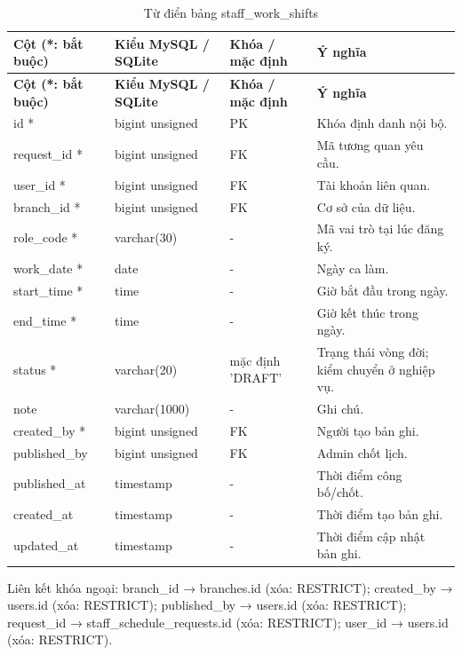 {\fontsize{10}{12}\selectfont\setlength{\tabcolsep}{3pt}\renewcommand{\arraystretch}{1.12}
\begin{longtable}{@{}L{\textwidth-4.86pt\relax} L{\textwidth-3.96pt\relax} L{\textwidth-2.88pt\relax} L{\textwidth-6.3pt\relax}@{}}
\caption{Từ điển bảng staff\_\allowbreak{}work\_\allowbreak{}shifts}\\
\toprule
\textbf{Cột (*:\allowbreak{} bắt buộc)} & \textbf{Kiểu My\allowbreak{}SQL /\allowbreak{} SQLite} & \textbf{Khóa /\allowbreak{} mặc định} & \textbf{Ý nghĩa}\\\midrule
\endfirsthead
\toprule
\textbf{Cột (*:\allowbreak{} bắt buộc)} & \textbf{Kiểu My\allowbreak{}SQL /\allowbreak{} SQLite} & \textbf{Khóa /\allowbreak{} mặc định} & \textbf{Ý nghĩa}\\\midrule
\endhead
\bottomrule\endlastfoot
id * & bigint unsigned & PK & Khóa định danh nội bộ.\allowbreak{}\\[1pt]
request\_\allowbreak{}id * & bigint unsigned & FK & Mã tương quan yêu cầu.\allowbreak{}\\[1pt]
user\_\allowbreak{}id * & bigint unsigned & FK & Tài khoản liên quan.\allowbreak{}\\[1pt]
branch\_\allowbreak{}id * & bigint unsigned & FK & Cơ sở của dữ liệu.\allowbreak{}\\[1pt]
role\_\allowbreak{}code * & varchar(30) & - & Mã vai trò tại lúc đăng ký.\allowbreak{}\\[1pt]
work\_\allowbreak{}date * & date & - & Ngày ca làm.\allowbreak{}\\[1pt]
start\_\allowbreak{}time * & time & - & Giờ bắt đầu trong ngày.\allowbreak{}\\[1pt]
end\_\allowbreak{}time * & time & - & Giờ kết thúc trong ngày.\allowbreak{}\\[1pt]
status * & varchar(20) & mặc định 'DRAFT' & Trạng thái vòng đời; kiểm chuyển ở nghiệp vụ.\allowbreak{}\\[1pt]
note & varchar(1000) & - & Ghi chú.\allowbreak{}\\[1pt]
created\_\allowbreak{}by * & bigint unsigned & FK & Người tạo bản ghi.\allowbreak{}\\[1pt]
published\_\allowbreak{}by & bigint unsigned & FK & Admin chốt lịch.\allowbreak{}\\[1pt]
published\_\allowbreak{}at & timestamp & - & Thời điểm công bố/\allowbreak{}chốt.\allowbreak{}\\[1pt]
created\_\allowbreak{}at & timestamp & - & Thời điểm tạo bản ghi.\allowbreak{}\\[1pt]
updated\_\allowbreak{}at & timestamp & - & Thời điểm cập nhật bản ghi.\allowbreak{}\\[1pt]
\end{longtable}}
Liên kết khóa ngoại:\allowbreak{} branch\_\allowbreak{}id → branches.\allowbreak{}id (xóa:\allowbreak{} RESTRICT); created\_\allowbreak{}by → users.\allowbreak{}id (xóa:\allowbreak{} RESTRICT); published\_\allowbreak{}by → users.\allowbreak{}id (xóa:\allowbreak{} RESTRICT); request\_\allowbreak{}id → staff\_\allowbreak{}schedule\_\allowbreak{}requests.\allowbreak{}id (xóa:\allowbreak{} RESTRICT); user\_\allowbreak{}id → users.\allowbreak{}id (xóa:\allowbreak{} RESTRICT).\allowbreak{}

